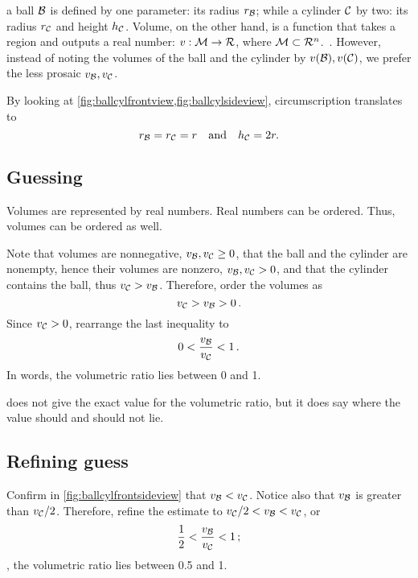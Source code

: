  a ball $\mathcal{B}$ is defined by one parameter: its radius $r_{\mathcal{B}}$; while a cylinder $\mathcal{C}$ by two: its radius $r_{\mathcal{C}}$ and height $h_{\mathcal{C}}$. Volume, on the other hand, is a function that takes a region and outputs a real number: ${v}:{\mathcal{M}}\to{\mathcal{R}}$, where $\mathcal{M}\subset\mathcal{R}^{n}$.~\cite[p.111]{apostol:1967}. However, instead of noting the volumes of the ball and the cylinder by $\volume\vat\ball,\volume\vat\cyl$, we prefer the less prosaic $v_{\mathcal{B}},v_{\mathcal{C}}$.

 By looking at \cref{fig:ballcylfrontview,fig:ballcylsideview}, circumscription translates to
%
\begin{equation}\label{eq:volumetricratioconstraint}
  r_{\mathcal{B}} = r_{\mathcal{C}} = r\quad\text{and}\quad h_{\mathcal{C}} = 2r.
\end{equation}



\subsection{Guessing} %
\label{sub:guessing}
%
 Volumes are represented by real numbers. Real numbers can be ordered. Thus, volumes can be ordered as well. 

 Note that volumes are nonnegative, $v_{\mathcal{B}},v_{\mathcal{C}}\geq 0$, that the ball and the cylinder are nonempty, hence their volumes are nonzero, $v_{\mathcal{B}},v_{\mathcal{C}} > 0$, and that the cylinder contains the ball, thus $v_{\mathcal{C}} > v_{\mathcal{B}}$. Therefore, order the volumes as 
%
\begin{equation*}
  v_{\mathcal{C}} > v_{\mathcal{B}} > 0\,.
\end{equation*}
%
 Since $v_{\mathcal{C}} > 0$, rearrange the last inequality to
%
\begin{equation}\label{eq:guesstimate}
  0 < \dfrac{v_{\mathcal{B}}}{v_{\mathcal{C}}} < 1\,.
\end{equation}
%
 In words, the volumetric ratio lies between 0 and 1. 

  does not give the exact value for the volumetric ratio, but it does say where the value should and should not lie.



\subsection{Refining guess} %
\label{sub:refining_guess}
%
 Confirm in \cref{fig:ballcylfrontsideview} that $v_{\mathcal{B}} < v_{\mathcal{C}}$. Notice also that $v_{\mathcal{B}}$ is greater than $v_{\mathcal{C}}/2$. Therefore, refine the estimate to $v_{\mathcal{C}}/2 < v_{\mathcal{B}} < v_{\mathcal{C}}$, or
%
\begin{equation}\label{eq:firstestimate}
  \dfrac 12 < \dfrac{v_{\mathcal{B}}}{v_{\mathcal{C}}} < 1\,;
\end{equation}
%
\ie, the volumetric ratio lies between 0.5 and 1.

